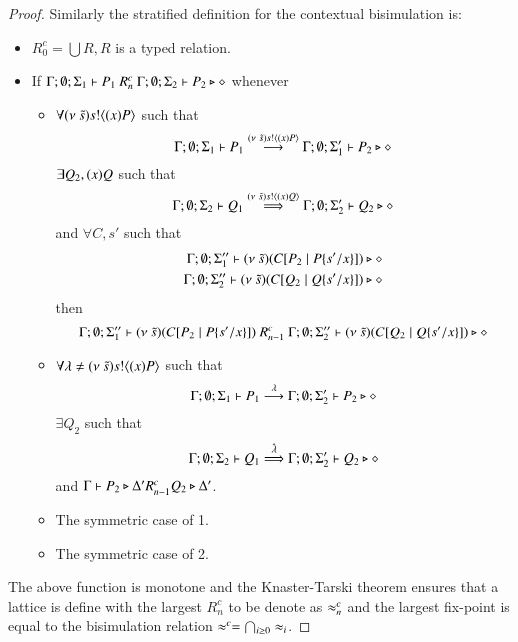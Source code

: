 \begin{proof}
	Similarly the stratified definition for the contextual bisimulation is:

	\begin{itemize}
		\item	$R^c_0 = \bigcup R, R$ is a typed relation.
		\item	If $\Gamma; \emptyset; \Sigma_1 \vdash P_1\ R^c_n\ \Gamma; \emptyset; \Sigma_2 \vdash P_2 \triangleright \diamond$
			whenever
			\begin{itemize}
				\item	$\forall (\nu\ \tilde{s}) s ! \langle (x)P \rangle$ such that
					\[
						\Gamma; \emptyset; \Sigma_1 \vdash P_1 \stackrel{(\nu\ \tilde{s}) s ! \langle (x)P \rangle}{\longrightarrow} \Gamma; \emptyset; \Sigma_1' \vdash P_2 \triangleright \diamond
					\]
					$\exists Q_2, (x)Q$ such that
					\[
						\Gamma; \emptyset; \Sigma_2 \vdash Q_1 \stackrel{(\nu\ \tilde{s}) s ! \langle (x)Q \rangle}{\Longrightarrow} \Gamma; \emptyset; \Sigma_2' \vdash Q_2 \triangleright \diamond
					\]
					and $\forall C, s'$
					such that
					\begin{eqnarray*}
						\Gamma; \emptyset; \Sigma_1'' \vdash (\nu\ \tilde{s})(C[P_2 \;|\; P \{s'/x \}]) \triangleright \diamond \\
						\Gamma; \emptyset; \Sigma_2'' \vdash (\nu\ \tilde{s})(C[Q_2 \;|\; Q \{s'/x \}]) \triangleright \diamond
					\end{eqnarray*}
					then
					\[
						\Gamma; \emptyset; \Sigma_1'' \proves \newsp{\tilde{s}}{\context{C}{P_2 \Par P \subst{s'}{x}}}\ R^c_{n-1}\ 
						\Gamma; \emptyset; \Sigma_2'' \proves \newsp{\tilde{s}}{\context{C}{Q_2 \Par Q \subst{s'}{x}}} \hastype \Proc
					\]

				\item	$\forall \lambda \not= (\nu\ \tilde{s}) s ! \langle (x)P \rangle$ such that
					\[
						\Gamma; \emptyset; \Sigma_1 \vdash P_1 \stackrel{\lambda}{\longrightarrow} \Gamma; \emptyset; \Sigma_2'\vdash P_2 \triangleright \diamond
					\]
					$\exists Q_2$ such that 
					\[
						\Gamma; \emptyset; \Sigma_2 \vdash Q_1 \stackrel{\hat{\lambda}}{\Longrightarrow} \Gamma; \emptyset; \Sigma_2' \vdash Q_2 \triangleright \diamond
					\]
					and
					$\Gamma \vdash P_2 \triangleright \Delta' R^c_{n-1} Q_2 \triangleright \Delta'$.

				\item	The symmetric case of 1.
				\item	The symmetric case of 2.
			\end{itemize}
	\end{itemize}
	The above function is monotone and the Knaster-Tarski theorem ensures that a lattice is define
	with the largest $R^c_n$ to be denote as $\approx^{c}_n$ and the largest fix-point is equal to the bisimulation relation $\approx^{c} = \bigcap_{i \geq 0} \approx_i$.
	\vspace{3mm}


\end{proof}
